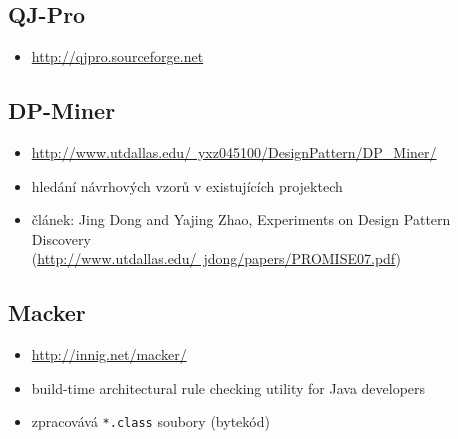 \subsection{QJ-Pro}
\begin{itemize}
\item \href{http://qjpro.sourceforge.net}{http://qjpro.sourceforge.net}
\end{itemize}

\subsection{DP-Miner}
\begin{itemize}
\item \href{http://www.utdallas.edu/~yxz045100/DesignPattern/DP\_Miner/}{http://www.utdallas.edu/~yxz045100/DesignPattern/DP\_Miner/}
\item hledání návrhových vzorů v existujících projektech
\item článek: Jing Dong and Yajing Zhao, Experiments on Design Pattern Discovery \\ (\href{http://www.utdallas.edu/~jdong/papers/PROMISE07.pdf}{http://www.utdallas.edu/~jdong/papers/PROMISE07.pdf})
\end{itemize}

\subsection{Macker}
\begin{itemize}
\item \href{http://innig.net/macker/}{http://innig.net/macker/}
\item build-time architectural rule checking utility for Java developers
\item zpracovává \verb+*.class+ soubory (bytekód)
\end{itemize}
